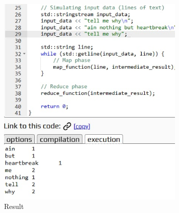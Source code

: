 \documentclass{article}
\begin{document}
\begin{figure}[h]
    \centering
    \includegraphics[width=0.8\textwidth]{wordcount.png} 
    \caption{Result}
    \label{fig:output}
\end{figure}
\end{document}
